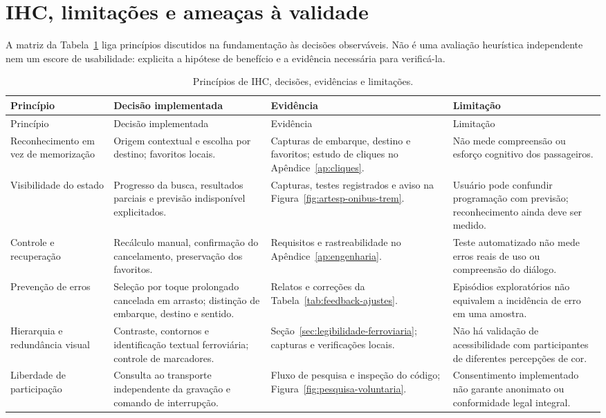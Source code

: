 \section{IHC, limitações e ameaças à validade}\label{sec:validade}

A matriz da Tabela~\ref{tab:ihc-evidencias} liga princípios discutidos na fundamentação às decisões observáveis. Não é uma avaliação heurística independente nem um escore de usabilidade: explicita a hipótese de benefício e a evidência necessária para verificá-la.
\begingroup\small\SingleSpacing\setlength{\parskip}{0pt}\setlength{\tabcolsep}{4pt}
\begin{longtable}{>{\raggedright\arraybackslash}p{2.8cm}p{4.0cm}p{4.2cm}p{3.5cm}}
\caption{Princípios de IHC, decisões, evidências e limitações.}\label{tab:ihc-evidencias}\\\hline
Princípio & Decisão implementada & Evidência & Limitação\\\hline\endfirsthead
\hline Princípio & Decisão implementada & Evidência & Limitação\\\hline\endhead\hline\endfoot
Reconhecimento em vez de memorização & Origem contextual e escolha por destino; favoritos locais. & Capturas de embarque, destino e favoritos; estudo de cliques no Apêndice~\ref{ap:cliques}. & Não mede compreensão ou esforço cognitivo dos passageiros.\\[4pt]
Visibilidade do estado & Progresso da busca, resultados parciais e previsão indisponível explicitados. & Capturas, testes registrados e aviso na Figura~\ref{fig:artesp-onibus-trem}. & Usuário pode confundir programação com previsão; reconhecimento ainda deve ser medido.\\[4pt]
Controle e recuperação & Recálculo manual, confirmação do cancelamento, preservação dos favoritos. & Requisitos e rastreabilidade no Apêndice~\ref{ap:engenharia}. & Teste automatizado não mede erros reais de uso ou compreensão do diálogo.\\[4pt]
Prevenção de erros & Seleção por toque prolongado cancelada em arrasto; distinção de embarque, destino e sentido. & Relatos e correções da Tabela~\ref{tab:feedback-ajustes}. & Episódios exploratórios não equivalem a incidência de erro em uma amostra.\\[4pt]
Hierarquia e redundância visual & Contraste, contornos e identificação textual ferroviária; controle de marcadores. & Seção~\ref{sec:legibilidade-ferroviaria}; capturas e verificações locais. & Não há validação de acessibilidade com participantes de diferentes percepções de cor.\\[4pt]
Liberdade de participação & Consulta ao transporte independente da gravação e comando de interrupção. & Fluxo de pesquisa e inspeção do código; Figura~\ref{fig:pesquisa-voluntaria}. & Consentimento implementado não garante anonimato ou conformidade legal integral.\\
\end{longtable}
\endgroup
